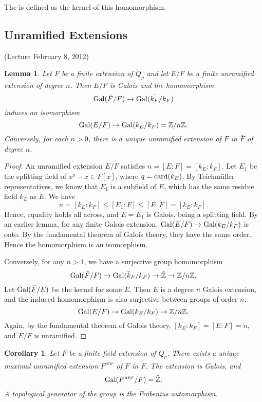 \documentclass{amsart}
\newtheorem{lemma}[equation]{Lemma}
\newtheorem{corollary}[equation]{Corollary}
\begin{document}
The  is defined as the kernel of this homomorphism.


\subsection{Unramified Extensions}


(Lecture February 8, 2012)


\begin{lemma}
  Let $F$ be a finite extension of $\ring{Q}_p$ and let $E/F$ be a
  finite unramified extension of degree $n$. Then $E/F$ is Galois and
  the homomorphism
\[
{\operatorname{Gal}}(\bar{{F}}/F)\to{\operatorname{Gal}}(\bar{k_F}/k_F)
\]
induces an isomorphism
\[
{\operatorname{Gal}}(E/F) \to {\operatorname{Gal}}(k_E/k_F) = \mathbb{Z}/n\mathbb{Z}.
\]
Conversely, for each $n>0$, there is a unique unramified extension of $F$ in $\bar F$
of degree $n$.
\end{lemma}

\begin{proof} An unramified extension $E/F$ satisfies $n=[E:F]=[k_E:k_F]$.
Let $E_1$ be the splitting field of $x^q - x \in F[x]$, where $q = {\operatorname{card}}(k_E)$.
By Teichm\"uller representatives, we know that $E_1$ is a subfield of $E$, which
has the same residue field $k_E$ as $E$.  We have
\[
n = [k_E:k_F] \le [E_1:F] \le [E:F] = [k_E:k_F].
\]
Hence, equality holds all across, and $E=E_1$ is Galois, being a splitting field.
By an earlier lemma, for any finite Galois extension, ${\operatorname{Gal}}(E/F)\to{\operatorname{Gal}}(k_E/k_F)$
is onto.  By the fundamental theorem of Galois theory, they have the same order.
Hence the homomorphism is an isomorphism.

Conversely, for any $n>1$, we have a surjective group homomorphism
\[
{\operatorname{Gal}}(\bar{F}/F)\to {\operatorname{Gal}}(\bar{k}_F/k_F) \to\hat{\mathbb{Z}}\to \mathbb{Z}/n\mathbb{Z}.
\]
Let ${\operatorname{Gal}}(\bar{F}/E)$ be the kernel for some $E$.  Then $E$ is a degree $n$
Galois extension, and the induced homomorphism is also surjective between groups
of order $n$:
\[
{\operatorname{Gal}}(E/F) \to {\operatorname{Gal}}(k_E/k_F)\to \mathbb{Z}/n\mathbb{Z}.
\]
Again, by the fundamental theorem of Galois theory, $[k_E:k_F]=[E:F]=n$,
and $E/F$ is unramified.
\end{proof}

\begin{corollary} Let $F$ be a finite field extension of $\ring{Q}_p$.
  There exists a unique maximal unramified extension $F^{unr}$ of $F$
  in $\bar{\ring{F}}$.  The extension is Galois, and
\[
{\operatorname{Gal}}(F^{unr}/F) = \hat{\mathbb{Z}}.
\]
A topological generator of the group is the Frobenius automorphism.
\end{corollary}
\end{document}
